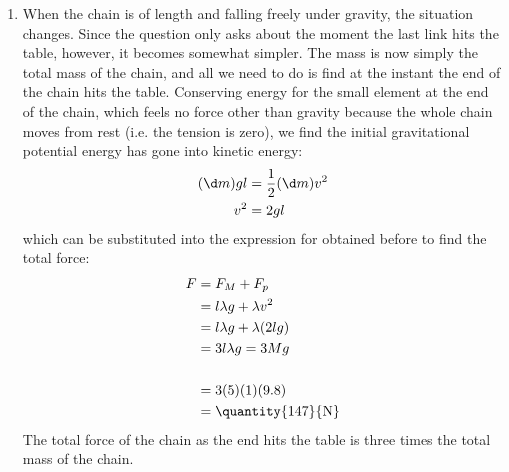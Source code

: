 \begin{problem}[HE+_Chain]
{\begin{enumerate}
The force from the momentum, given by Newton's Second Law, requires us to know . We know  and so at constant ,  $=$ . Thus  $=$  downwards.

The total force is the sum of  and :
\begin{eqnarray*} 
F &= F_{M} + F_{p} \\ 
&= \lambda v g t + \lambda v^{2} \\ 
\\ 
&= [(1)(5)(9.8)(5) + (1)(5)^{2}] \\ &= \mbox{\quantity{270}{N}}
 \end{eqnarray*}
	\item When the chain is of length  and falling freely under gravity, the situation changes. Since the question only asks about the moment the last link hits the table, however, it becomes somewhat simpler. The mass  is now simply the total mass of the chain, and all we need to do is find  at the instant the end of the chain hits the table. Conserving energy for the small element at the end of the chain, which feels no force other than gravity because the whole chain moves from rest (i.e. the tension is zero), we find the initial gravitational potential energy has gone into kinetic energy:
\begin{eqnarray*} 
(\d m)gl &= \frac{1}{2}(\d m)v^{2} \\ 
v^{2} &= 2gl 
\end{eqnarray*}
which can be substituted into the expression for  obtained before to find the total force:
\begin{eqnarray*} F &= F_{M} + F_{p} \\ 
&= l\lambda g + \lambda v^{2} \\ 
&= l\lambda g + \lambda (2lg) \\ &= 3 l \lambda g = 3Mg \\ \\ 
&= 3(5)(1)(9.8)
\\ &= \mbox{\quantity{147}{N}}
 \end{eqnarray*}
The total force of the chain as the end hits the table is three times the total mass of the chain.
\end{enumerate}
}
\end{problem}
